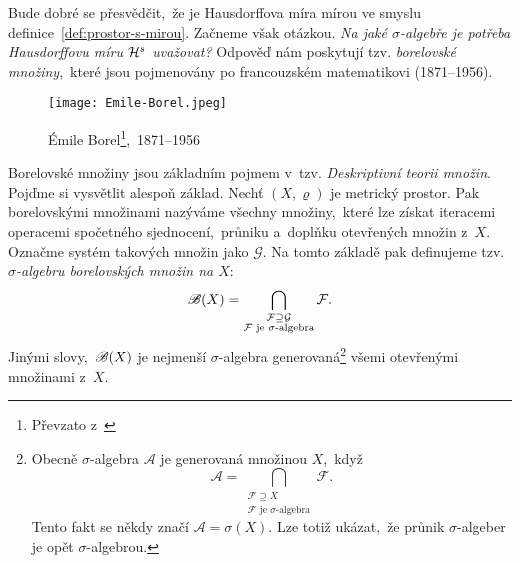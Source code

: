 Bude dobré se přesvědčit,~že je Hausdorffova míra mírou ve smyslu definice~\ref{def:prostor-s-mirou}. Začneme však otázkou. \emph{Na jaké $\sigma$-algebře je potřeba Hausdorffovu míru $\mathcal{H}^{s}$ uvažovat?} Odpověď nám poskytují tzv. \emph{borelovské množiny},~které jsou pojmenovány po francouzském matematikovi  (1871--1956).
\begin{figure}[h]
    \centering
    \texttt{[image: Emile-Borel.jpeg]}
    \caption[Émile Borel,~1871--1956]{Émile Borel\footnote{Převzato z~\cite{OConnorBorel2025}},~1871--1956}
    \label{fig:emile-borel}
\end{figure}
Borelovské množiny jsou základním pojmem v~tzv. \emph{Deskriptivní teorii množin}. Pojďme si vysvětlit alespoň základ. Nechť $(X,\varrho)$ je metrický prostor. Pak borelovskými množinami nazýváme všechny množiny,~které lze získat iteracemi operacemi spočetného sjednocení,~průniku a~doplňku otevřených množin z~$X$. Označme systém takových množin jako $\mathcal{G}$. Na tomto základě pak definujeme tzv. \emph{$\sigma$-algebru borelovských množin na $X$}:
\[\mathscr{B}(X)=\bigcap_{\substack{\mathcal{F}\supseteq\mathcal{G}\\\text{$\mathcal{F}$ je $\sigma$-algebra}}}\mathcal{F}.\]
Jinými slovy,~$\mathscr{B}(X)$ je nejmenší $\sigma$-algebra generovaná\footnote{Obecně $\sigma$-algebra $\mathcal{A}$ je generovaná množinou $X$,~když
\[\mathcal{A}=\bigcap_{\substack{\mathcal{F}\supseteq X\\\text{$\mathcal{F}$ je $\sigma$-algebra}}}\mathcal{F}.\]
Tento fakt se někdy značí $\mathcal{A}=\sigma(X)$. Lze totiž ukázat,~že průnik $\sigma$-algeber je opět $\sigma$-algebrou.} všemi otevřenými množinami z~$X$.

